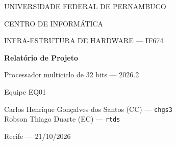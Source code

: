 \documentclass[12pt,a4paper]{article}
\newcommand{\Equipe}{EQ01}
\newcommand{\Integrantes}{Carlos Henrique Gonçalves dos Santos (CC) --- \texttt{chgs3}\\[0.25cm]Robson Thiago Duarte (EC) --- \texttt{rtds}}
\begin{document}
\hypersetup{pageanchor=false}
\begin{titlepage}
  \centering
  {\large UNIVERSIDADE FEDERAL DE PERNAMBUCO\par}
  {\large CENTRO DE INFORMÁTICA\par}
  \vspace{1.1cm}
  {\large INFRA-ESTRUTURA DE HARDWARE — IF674\par}
  \vfill
  {\LARGE\bfseries Relatório de Projeto\par}
  \vspace{0.6cm}
  {\large Processador multiciclo de 32 bits — 2026.2\par}
  \vfill
  {\large Equipe \Equipe\par}
  \vspace{0.5cm}
  \Integrantes\par
  \vfill
  Recife — 21/10/2026\par
\end{titlepage}

\hypersetup{pageanchor=true}
\tableofcontents
\clearpage
\listoffigures
\clearpage
\listoftables
\clearpage
{}








\appendix


\end{document}
